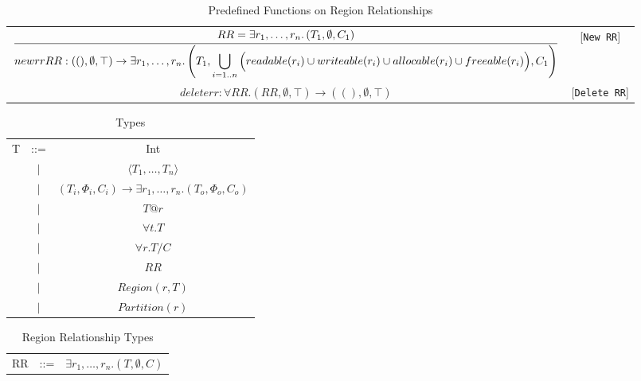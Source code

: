 \documentclass{article}
\newcommand{\infrule}[2]{\displaystyle\frac{\displaystyle\strut{#1}}{\displaystyle\strut {#2}}}
\newcommand{\rtriple}[3]{\left({#1},{#2},{#3}\right)}
\newcommand{\rsingle}[1]{\rtriple{#1}{\emptyset}{\top}}
\newcommand{\rtripsub}[3]{\rtriple{#1}{\Phi_{#2}}{C_{#3}}}
\begin{document}
\begin{table*}
\centering
{\small
\begin{tabular}{cc}

%
%
\begin{math}
\infrule{
  RR = \exists r_1, \ldots, r_n. \rtriple{T_1}{\emptyset}{C_1}
}{
  newrr RR : \rsingle{()} \rightarrow \exists r_1, \ldots, r_n. \rtriple{T_1}{\bigcup_{i = 1..n} \Big( readable(r_i) \cup writeable(r_i) \cup allocable(r_i) \cup freeable(r_i) \Big)}{C_1}
}
\end{math} & [{\tt New RR}] \\

%
%
\begin{math}
deleterr : \forall RR. \rsingle{RR} \rightarrow \rsingle{()}
\end{math} & [{\tt Delete RR}] \\
\end{tabular}
}
\caption{Predefined Functions on Region Relationships}
\end{table*}

\begin{table*}
\centering
{\small
\begin{tabular}{ccc}

T & ::= & Int \\
  &$\mid$&$\langle T_1, \ldots, T_n \rangle$ \\
  &$\mid$&$\rtripsub{T_i}{i}{i} \rightarrow \exists r_1, \ldots, r_n.\rtripsub{T_o}{o}{o}$ \\
  &$\mid$&$T@r$\\
  &$\mid$&$\forall t.T$ \\
  &$\mid$&$\forall r.T/C$ \\
  &$\mid$&$RR$ \\
  &$\mid$&$Region(r,T)$ \\
  &$\mid$&$Partition(r)$ \\

\end{tabular}
}
\caption{Types}
\end{table*}

\begin{table*}
\centering
{\small
\begin{tabular}{ccc}
RR & ::= & $\exists r_1, \ldots, r_n.\rtriple{T}{\emptyset}{C}$ \\
\end{tabular}
}
\caption{Region Relationship Types}
\end{table*}
\end{document}

